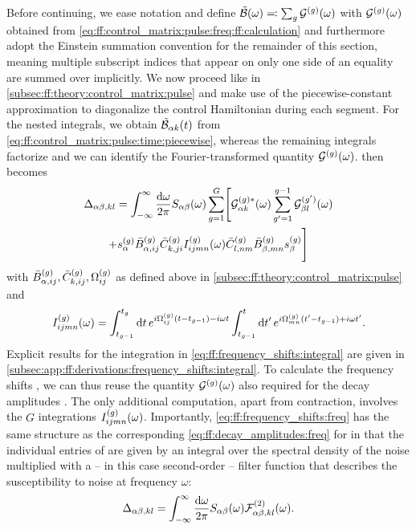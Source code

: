 Before continuing, we ease notation and define $\tilde{\mathcal{B}}(\omega) \eqqcolon \sum_g\mathcal{G}^{(g)}(\omega)$ with $\mathcal{G}^{(g)}(\omega)$ obtained from \cref{eq:ff:control_matrix:pulse:freq:ff:calculation} and furthermore adopt the Einstein summation convention for the remainder of this section, meaning multiple subscript indices that appear on only one side of an equality are summed over implicitly.
We now proceed like in \cref{subsec:ff:theory:control_matrix:pulse} and make use of the piecewise-constant approximation to diagonalize the control Hamiltonian during each segment.
For the nested integrals, we obtain $\tilde{\mathcal{B}}_{\alpha k}(t)$ from \cref{eq:ff:control_matrix:pulse:time:piecewise}, whereas the remaining integrals factorize and we can identify the Fourier-transformed quantity $\mathcal{G}^{(g)}(\omega)$.
 then becomes
\begin{multline}\label{eq:ff:frequency_shifts:freq}
    \Delta_{\alpha\beta,kl} = \int_{-\infty}^\infty\frac{\dd{\omega}}{2\pi} S_{\alpha\beta}(\omega)\sum_{g=1}^G\Biggl[
        \mathcal{G}_{\alpha k}^{(g)\ast}(\omega)\sum_{g^\prime=1}^{g-1}\mathcal{G}_{\beta l}^{(g^\prime)}(\omega) \\
        + s_\alpha^{(g)}\bar{B}_{\alpha,ij}^{(g)}\bar{C}_{k,ji}^{(g)} I_{ijmn}^{(g)}(\omega)
        \bar{C}_{l,nm}^{(g)}\bar{B}_{\beta,mn}^{(g)} s_\beta^{(g)}
        \Biggr]
\end{multline}
with $\bar{B}_{\alpha,ij}^{(g)},\bar{C}_{k,ij}^{(g)},\Omega_{ij}^{(g)}$ as defined above in \cref{subsec:ff:theory:control_matrix:pulse} and
\begin{equation}\label{eq:ff:frequency_shifts:integral}
    I_{ijmn}^{(g)}(\omega) = \int_{t_{g-1}}^{t_g}\dd{t}e^{i\Omega_{ij}^{(g)}(t - t_{g-1}) - i\omega t}
        \int_{t_{g-1}}^{t}\dd{t'}e^{i\Omega_{mn}^{(g)}(t' - t_{g-1}) + i\omega t'}.
\end{equation}
Explicit results for the integration in \cref{eq:ff:frequency_shifts:integral} are given in \cref{subsec:app:ff:derivations:frequency_shifts:integral}.
To calculate the frequency shifts \freqshifts, we can thus reuse the quantity $\mathcal{G}^{(g)}(\omega)$ also required for the decay amplitudes \decayamps.
The only additional computation, apart from contraction, involves the $G$ integrations $I_{ijmn}^{(g)}(\omega)$.
Importantly, \cref{eq:ff:frequency_shifts:freq} has the same structure as the corresponding \cref{eq:ff:decay_amplitudes:freq} for \decayamps in that the individual entries of \freqshifts are given by an integral over the spectral density of the noise multiplied with a -- in this case second-order -- filter function that describes the susceptibility to noise at frequency $\omega$:
\begin{equation}\label{eq:ff:frequency_shifts:filter_function}
    \Delta_{\alpha\beta,kl} = \int_{-\infty}^\infty\frac{\dd{\omega}}{2\pi} S_{\alpha\beta}(\omega) \mathcal{F}_{\alpha\beta,kl}^{(2)}(\omega).
\end{equation}

